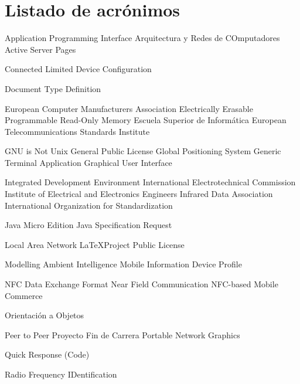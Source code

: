 
\chapter{Listado de acrónimos}

{\small
\begin{acronym}[XXXXXXXX]
       {Application Programming Interface}
      {Arquitectura y Redes de COmputadores}
       {Active Server Pages}

      {Connected Limited Device Configuration}

       {Document Type Definition}

      {European Computer Manufacturers Association}
    {Electrically Erasable Programmable Read-Only Memory}
       {Escuela Superior de Informática}
      {European Telecommunications Standards Institute}

       {GNU is Not Unix}
       {General Public License}
       {Global Positioning System}
       {Generic Terminal Application}
       {Graphical User Interface}

       {Integrated Development Environment}
       {International Electrotechnical Commission}
      {Institute of Electrical and Electronics Engineers}
      {Infrared Data Association}
       {International Organization for Standardization}

    {Java Micro Edition}
       {Java Specification Request}

       {Local Area Network}
      {\LaTeX Project Public License}

      {Modelling Ambient Intelligence}
      {Mobile Information Device Profile}

      {NFC Data Exchange Format}
       {Near Field Communication}
       {NFC-based Mobile Commerce}

        {Orientación a Objetos}

       {Peer to Peer}
       {Proyecto Fin de Carrera}
       {Portable Network Graphics}
  
        {Quick Response (Code)}

      {Radio Frequency IDentification}


\end{acronym}}
